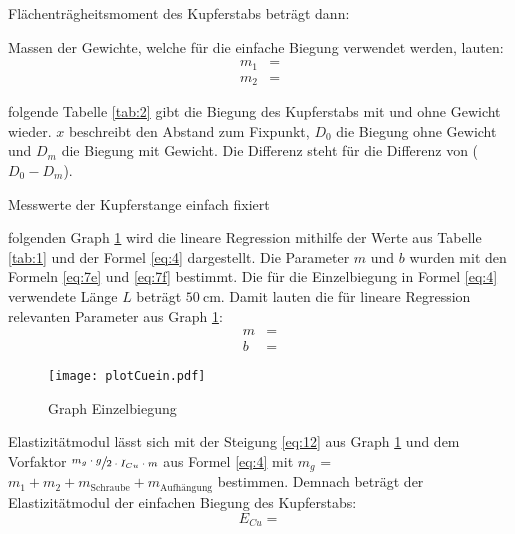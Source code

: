 \justifying Flächenträgheitsmoment des Kupferstabs beträgt dann:


\justifying Massen der Gewichte, welche für die einfache Biegung verwendet werden, lauten:
\begin{subequations}\label{eq:11}
\begin{align}
    m_1 &= \text{} \label{eq:11a}\\
    m_2 &= \text{} \label{eq:11b}
\end{align}
\end{subequations}

\justifying folgende Tabelle \ref{tab:2} gibt die Biegung des Kupferstabs mit und ohne Gewicht wieder. $x$ beschreibt den Abstand zum Fixpunkt, $D_0$
die Biegung ohne Gewicht und $D_m$ die Biegung mit Gewicht. Die Differenz steht für die Differenz von ($D_0-D_m$).
\begin{table}[H]
    \centering
    
    \caption{Messwerte der Kupferstange einfach fixiert}
    \label{tab:2}
\end{table}

\justifying folgenden Graph \ref{fig:1} wird die lineare Regression mithilfe der Werte aus Tabelle \ref{tab:1} und der Formel \eqref{eq:4} dargestellt.
Die Parameter $m$ und $b$ wurden mit den Formeln \eqref{eq:7e} und \eqref{eq:7f} bestimmt. Die für die Einzelbiegung in Formel \eqref{eq:4} verwendete Länge $L$ beträgt
$\SI{50}{\centi\meter}$. Damit lauten die für lineare Regression relevanten Parameter aus Graph \ref{fig:1}:
\begin{align}
    m &= \text{} \label{eq:12}\\
    b &= \text{} \label{eq:13}
\end{align}

\begin{figure}[H]
    \centering
    \texttt{[image: plotCuein.pdf]}
    \caption{Graph Einzelbiegung}
    \label{fig:1}
\end{figure}

\justifying Elastizitätmodul lässt sich mit der Steigung \eqref{eq:12} aus Graph \ref{fig:1} und dem Vorfaktor 
$\sfrac{m_g \cdot g}{2 \cdot I_{Cu} \cdot m}$ aus Formel \eqref{eq:4} mit $m_g$ = $m_1 + m_2 + m_{\text{Schraube}} + m_{\text{Aufhängung}}$ 
bestimmen. Demnach beträgt der Elastizitätmodul der einfachen Biegung des Kupferstabs:
\begin{equation}
E_{Cu} =  \label{eq:14}
\end{equation}

